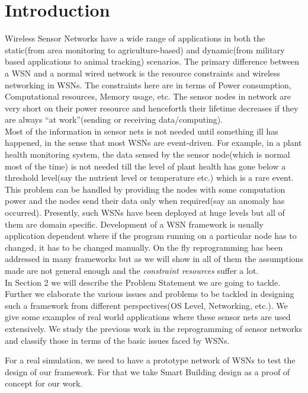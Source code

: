 \documentclass[twocolumn]{article}
\begin{document}
\section{Introduction}
Wireless Sensor Networks have a wide range of applications in both the static(from area monitoring\cite{mainwaring2002wireless} to agriculture-based\cite{baggio2005wireless}) and dynamic(from military based applications to animal tracking\cite{sikka2004wireless}) scenarios. The primary difference between a WSN and a normal wired network is the resource constraints and wireless networking in WSNs. The constraints here are in terms of Power consumption, Computational resources, Memory usage, etc. The sensor nodes in network are very short on their power resource and henceforth their lifetime decreases if they are always ``at work''(sending or receiving data/computing).\\
Most of the information in sensor nets is not needed until something ill has happened, in the sense that most WSNs are event-driven. For example, in a plant health monitoring system\cite{mainwaring2002wireless}, the data sensed by the sensor node(which is normal most of the time) is not needed till the level of plant health has gone below a threshold level(say the nutrient level or temperature etc.) which is a rare event. This problem can be handled by providing the nodes with some computation power and the nodes send their data only when required(say an anomaly has occurred).
Presently, such WSNs have been deployed at huge levels but all of them are domain specific. Development of a WSN framework is usually application dependent where if the program running on a particular node has to changed, it has to be changed manually. On the fly reprogramming has been addressed in many frameworks but as we will show in all of them the assumptions made are not general enough and the \emph{constraint resources} suffer a lot.\\
In Section 2 we will describe the Problem Statement we are going to tackle. Further we elaborate the various issues and problems to be tackled in designing such a framework from different perspectives(OS Level, Networking, etc.). We give some examples of real world applications where these sensor nets are used extensively. We study the previous work in the reprogramming of sensor networks and classify those in terms of the basic issues faced by WSNs.

For a real simulation, we need to have a prototype network of WSNs to test the design of our framework. For that we take Smart Building design as a proof of concept for our work.
\end{document}
